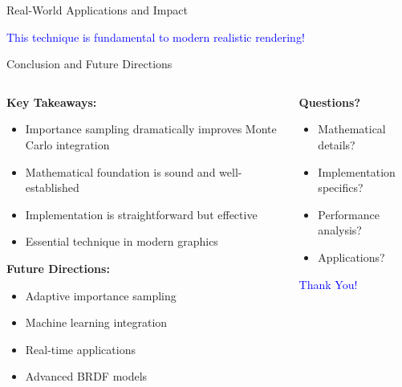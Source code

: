 \documentclass[aspectratio=169]{beamer}
\begin{document}
\begin{frame}{Real-World Applications and Impact}
    \vspace{0.5cm}
    \begin{center}
        \textcolor{blue}{\large This technique is fundamental to modern realistic rendering!}
    \end{center}
\end{frame}

\begin{frame}{Conclusion and Future Directions}
    \begin{columns}
        \begin{column}{0.6\textwidth}
            \textbf{Key Takeaways:}
            \begin{itemize}
                \item<1-> Importance sampling dramatically improves Monte Carlo integration
                \item<2-> Mathematical foundation is sound and well-established
                \item<3-> Implementation is straightforward but effective
                \item<4-> Essential technique in modern graphics
            \end{itemize}
            
            \vspace{0.5cm}
            \textbf{Future Directions:}
            \begin{itemize}
                \item Adaptive importance sampling
                \item Machine learning integration
                \item Real-time applications
                \item Advanced BRDF models
            \end{itemize}
        \end{column}
        \begin{column}{0.4\textwidth}
            \textbf{Questions?}
            \begin{itemize}
                \item Mathematical details?
                \item Implementation specifics?
                \item Performance analysis?
                \item Applications?
            \end{itemize}
            
            \vspace{1cm}
            \begin{center}
                \textcolor{blue}{\large Thank You!}
            \end{center}
        \end{column}
    \end{columns}
    

\end{frame}
\end{document}
